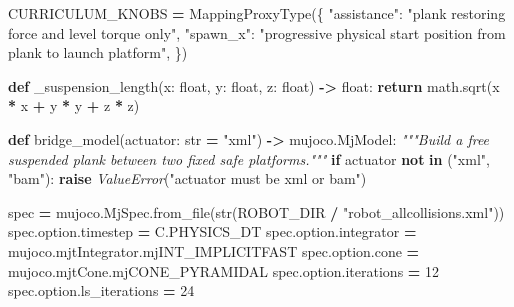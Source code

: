 \documentclass[
  american,
  11pt,
  letterpaper,
]{article}
\newenvironment{Shaded}{\begin{snugshade}}{\end{snugshade}}
\newcommand{\BuiltInTok}[1]{#1}
\newcommand{\CommentTok}[1]{\textcolor[rgb]{0.56,0.35,0.01}{\textit{#1}}}
\newcommand{\ControlFlowTok}[1]{\textcolor[rgb]{0.13,0.29,0.53}{\textbf{#1}}}
\newcommand{\DecValTok}[1]{\textcolor[rgb]{0.00,0.00,0.81}{#1}}
\newcommand{\KeywordTok}[1]{\textcolor[rgb]{0.13,0.29,0.53}{\textbf{#1}}}
\newcommand{\NormalTok}[1]{#1}
\newcommand{\OperatorTok}[1]{\textcolor[rgb]{0.81,0.36,0.00}{\textbf{#1}}}
\newcommand{\PreprocessorTok}[1]{\textcolor[rgb]{0.56,0.35,0.01}{\textit{#1}}}
\newcommand{\StringTok}[1]{\textcolor[rgb]{0.31,0.60,0.02}{#1}}
\renewenvironment{Shaded}{\par\smallskip}{\par\smallskip}
\begin{document}
\begin{Shaded}
\begin{Highlighting}[]
\NormalTok{CURRICULUM\_KNOBS }\OperatorTok{=}\NormalTok{ MappingProxyType(\{}
    \StringTok{"assistance"}\NormalTok{: }\StringTok{"plank restoring force and level torque only"}\NormalTok{,}
    \StringTok{"spawn\_x"}\NormalTok{: }\StringTok{"progressive physical start position from plank to launch platform"}\NormalTok{,}
\NormalTok{\})}


\KeywordTok{def}\NormalTok{ \_suspension\_length(x: }\BuiltInTok{float}\NormalTok{, y: }\BuiltInTok{float}\NormalTok{, z: }\BuiltInTok{float}\NormalTok{) }\OperatorTok{{-}\textgreater{}} \BuiltInTok{float}\NormalTok{:}
    \ControlFlowTok{return}\NormalTok{ math.sqrt(x }\OperatorTok{*}\NormalTok{ x }\OperatorTok{+}\NormalTok{ y }\OperatorTok{*}\NormalTok{ y }\OperatorTok{+}\NormalTok{ z }\OperatorTok{*}\NormalTok{ z)}


\KeywordTok{def}\NormalTok{ bridge\_model(actuator: }\BuiltInTok{str} \OperatorTok{=} \StringTok{"xml"}\NormalTok{) }\OperatorTok{{-}\textgreater{}}\NormalTok{ mujoco.MjModel:}
    \CommentTok{"""Build a free suspended plank between two fixed safe platforms."""}
    \ControlFlowTok{if}\NormalTok{ actuator }\KeywordTok{not} \KeywordTok{in}\NormalTok{ (}\StringTok{"xml"}\NormalTok{, }\StringTok{"bam"}\NormalTok{):}
        \ControlFlowTok{raise} \PreprocessorTok{ValueError}\NormalTok{(}\StringTok{"actuator must be xml or bam"}\NormalTok{)}

\NormalTok{    spec }\OperatorTok{=}\NormalTok{ mujoco.MjSpec.from\_file(}\BuiltInTok{str}\NormalTok{(ROBOT\_DIR }\OperatorTok{/} \StringTok{"robot\_allcollisions.xml"}\NormalTok{))}
\NormalTok{    spec.option.timestep }\OperatorTok{=}\NormalTok{ C.PHYSICS\_DT}
\NormalTok{    spec.option.integrator }\OperatorTok{=}\NormalTok{ mujoco.mjtIntegrator.mjINT\_IMPLICITFAST}
\NormalTok{    spec.option.cone }\OperatorTok{=}\NormalTok{ mujoco.mjtCone.mjCONE\_PYRAMIDAL}
\NormalTok{    spec.option.iterations }\OperatorTok{=} \DecValTok{12}
\NormalTok{    spec.option.ls\_iterations }\OperatorTok{=} \DecValTok{24}


\end{Highlighting}
\end{Shaded}
\end{document}
